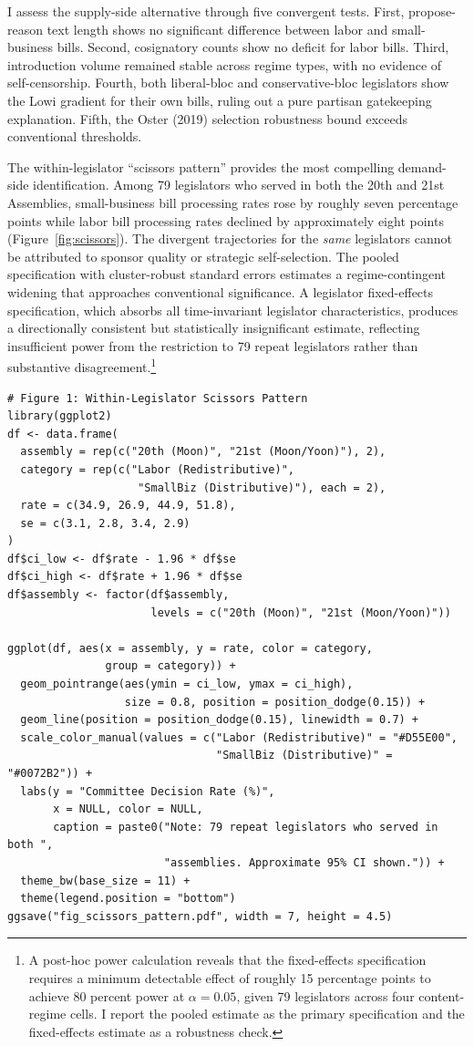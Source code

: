 \documentclass[11pt]{article}
\begin{document}
I assess the supply-side alternative through five convergent tests. First, propose-reason text length shows no significant difference between labor and small-business bills. Second, cosignatory counts show no deficit for labor bills. Third, introduction volume remained stable across regime types, with no evidence of self-censorship. Fourth, both liberal-bloc and conservative-bloc legislators show the Lowi gradient for their own bills, ruling out a pure partisan gatekeeping explanation. Fifth, the Oster (2019) selection robustness bound exceeds conventional thresholds.

The within-legislator ``scissors pattern'' provides the most compelling demand-side identification. Among 79 legislators who served in both the 20th and 21st Assemblies, small-business bill processing rates rose by roughly seven percentage points while labor bill processing rates declined by approximately eight points (Figure~\ref{fig:scissors}). The divergent trajectories for the \emph{same} legislators cannot be attributed to sponsor quality or strategic self-selection. The pooled specification with cluster-robust standard errors estimates a regime-contingent widening that approaches conventional significance. A legislator fixed-effects specification, which absorbs all time-invariant legislator characteristics, produces a directionally consistent but statistically insignificant estimate, reflecting insufficient power from the restriction to 79 repeat legislators rather than substantive disagreement.\footnote{A post-hoc power calculation reveals that the fixed-effects specification requires a minimum detectable effect of roughly 15 percentage points to achieve 80 percent power at $\alpha = 0.05$, given 79 legislators across four content-regime cells. I report the pooled estimate as the primary specification and the fixed-effects estimate as a robustness check.}

\begin{verbatim}
# Figure 1: Within-Legislator Scissors Pattern
library(ggplot2)
df <- data.frame(
  assembly = rep(c("20th (Moon)", "21st (Moon/Yoon)"), 2),
  category = rep(c("Labor (Redistributive)",
                    "SmallBiz (Distributive)"), each = 2),
  rate = c(34.9, 26.9, 44.9, 51.8),
  se = c(3.1, 2.8, 3.4, 2.9)
)
df$ci_low <- df$rate - 1.96 * df$se
df$ci_high <- df$rate + 1.96 * df$se
df$assembly <- factor(df$assembly,
                      levels = c("20th (Moon)", "21st (Moon/Yoon)"))

ggplot(df, aes(x = assembly, y = rate, color = category,
               group = category)) +
  geom_pointrange(aes(ymin = ci_low, ymax = ci_high),
                  size = 0.8, position = position_dodge(0.15)) +
  geom_line(position = position_dodge(0.15), linewidth = 0.7) +
  scale_color_manual(values = c("Labor (Redistributive)" = "#D55E00",
                                "SmallBiz (Distributive)" = "#0072B2")) +
  labs(y = "Committee Decision Rate (%)",
       x = NULL, color = NULL,
       caption = paste0("Note: 79 repeat legislators who served in both ",
                        "assemblies. Approximate 95% CI shown.")) +
  theme_bw(base_size = 11) +
  theme(legend.position = "bottom")
ggsave("fig_scissors_pattern.pdf", width = 7, height = 4.5)
\end{verbatim}
\end{document}
